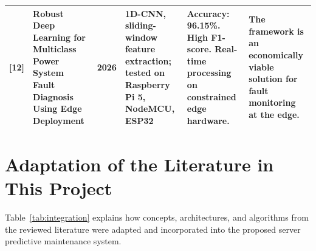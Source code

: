 \documentclass[12pt,a4paper]{report}
\begin{document}
\begin{table}[!htbp]
\begin{tabular}{|c|p{3.4cm}|c|p{3.0cm}|p{4.6cm}|p{3.9cm}|}
    [12] & Robust Deep Learning for Multiclass Power System Fault Diagnosis Using Edge Deployment & 2026 & 1D-CNN, sliding-window feature extraction; tested on Raspberry Pi 5, NodeMCU, ESP32 & \textbf{Accuracy:} 96.15\%. High F1-score. Real-time processing on constrained edge hardware. & The framework is an economically viable solution for fault monitoring at the edge. \\ \hline
  \end{tabular}
\end{table}
\clearpage
\restoregeometry

\section{Adaptation of the Literature in This Project}

Table~\ref{tab:integration} explains how concepts, architectures, and algorithms from the reviewed literature were adapted and incorporated into the proposed server predictive maintenance system.
\end{document}
